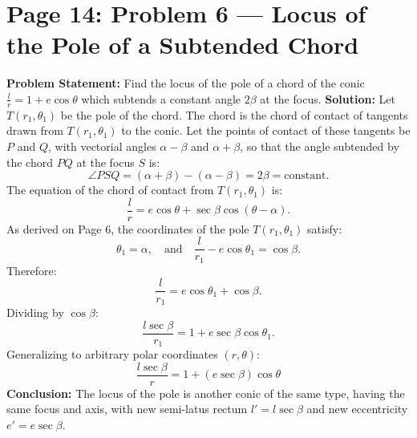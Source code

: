 \newpage
\section{Page 14: Problem 6 --- Locus of the Pole of a Subtended Chord}
\label{sec:page14}

\begin{examplebox}
\textbf{Problem Statement:}
Find the locus of the pole of a chord of the conic $\frac{l}{r} = 1 + e\cos\theta$ which subtends a constant angle $2\beta$ at the focus.
\tcblower
\textbf{Solution:}
Let $T(r_1, \theta_1)$ be the pole of the chord.
The chord is the chord of contact of tangents drawn from $T(r_1, \theta_1)$ to the conic.
Let the points of contact of these tangents be $P$ and $Q$, with vectorial angles $\alpha - \beta$ and $\alpha + \beta$, so that the angle subtended by the chord $PQ$ at the focus $S$ is:
\begin{equation}
    \angle PSQ = (\alpha + \beta) - (\alpha - \beta) = 2\beta = \text{constant}.
\end{equation}
The equation of the chord of contact from $T(r_1, \theta_1)$ is:
\begin{equation}
    \frac{l}{r} = e\cos\theta + \sec\beta\cos(\theta - \alpha).
\end{equation}
As derived on Page 6, the coordinates of the pole $T(r_1, \theta_1)$ satisfy:
\begin{equation}
    \theta_1 = \alpha, \quad \text{and} \quad \frac{l}{r_1} - e\cos\theta_1 = \cos\beta.
\end{equation}
Therefore:
\begin{equation}
    \frac{l}{r_1} = e\cos\theta_1 + \cos\beta.
\end{equation}
Dividing by $\cos\beta$:
\begin{equation}
    \frac{l\sec\beta}{r_1} = 1 + e\sec\beta\cos\theta_1.
\end{equation}
Generalizing to arbitrary polar coordinates $(r, \theta)$:
\begin{equation}
    \boxed{\frac{l\sec\beta}{r} = 1 + (e\sec\beta)\cos\theta}
\end{equation}
\textbf{Conclusion:}
The locus of the pole is another conic of the same type, having the same focus and axis, with new semi-latus rectum $l' = l\sec\beta$ and new eccentricity $e' = e\sec\beta$.
\end{examplebox}
